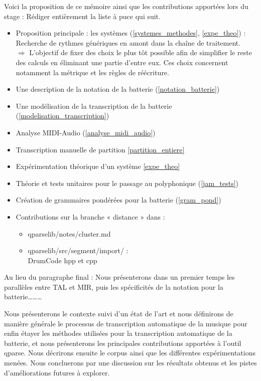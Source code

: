 Voici la proposition de ce mémoire ainsi que les contributions apportées lors
du stage :
Rédiger entièrement la liste à puce qui suit.
\begin{itemize}
	\item Proposition principale : les systèmes (\ref{systemes_methodes},
		\ref{expe_theo}) :\\
	Recherche de rythmes génériques en amont dans la chaîne de traitement.\\
	$\Rightarrow$ L’objectif de fixer des choix le plus tôt possible afin de
	simplifier le reste des calculs en éliminant une partie d’entre eux. Ces
	choix concernent notamment la métrique et les règles de réécriture.
	\item Une description de la notation de la batterie
		(\ref{notation_batterie})
	\item Une modélisation de la transcription de la batterie
		(\ref{modelisation_transcription})
	\item Analyse MIDI-Audio (\ref{analyse_midi_audio})
	\item Transcription manuelle de partition \ref{partition_entiere}
	\item Expérimentation théorique d’un système \ref{expe_theo}
	\item Théorie et tests unitaires pour le passage au polyphonique
		(\ref{jam_tests})
	\item Création de grammaires pondérées pour la batterie (\ref{gram_pond})
	\item Contributions sur la branche « distance » dans :
	\begin{itemize}
		\item qparselib/notes/cluster.md
		\item qparselib/src/segment/import/ :\\
		DrumCode hpp et cpp\\
	\end{itemize}
\end{itemize}

Au lieu du paragraphe final : Nous présenterons dans un premier temps les
parallèles entre TAL et MIR, puis les spécificités de la notation pour la
batterie……… 

Nous présenterons le contexte suivi d’un état de l’art et nous définirons de
manière générale le processus de transcription automatique de la musique pour
enfin étayer les méthodes utilisées pour la transcription automatique de la
batterie, et nous présenterons les principales contributions apportées à
l’outil qparse. Nous décrirons ensuite le corpus ainsi que les différentes
expérimentations menées. Nous concluerons par une discussion sur les résultats
obtenus et les pistes d’améliorations futures à explorer.

